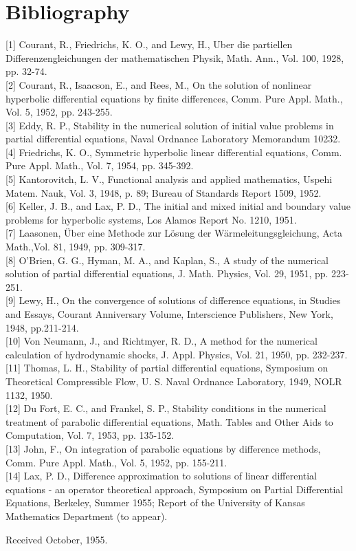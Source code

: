 \documentclass[10pt]{article}
\begin{document}
\section*{Bibliography}
[1] Courant, R., Friedrichs, K. O., and Lewy, H., Uber die partiellen Differenzengleichungen der mathematischen Physik, Math. Ann., Vol. 100, 1928, pp. 32-74.\\[0pt]
[2] Courant, R., Isaacson, E., and Rees, M., On the solution of nonlinear hyperbolic differential equations by finite differences, Comm. Pure Appl. Math., Vol. 5, 1952, pp. 243-255.\\[0pt]
[3] Eddy, R. P., Stability in the numerical solution of initial value problems in partial differential equations, Naval Ordnance Laboratory Memorandum 10232.\\[0pt]
[4] Friedrichs, K. O., Symmetric hyperbolic linear differential equations, Comm. Pure Appl. Math., Vol. 7, 1954, pp. 345-392.\\[0pt]
[5] Kantorovitch, L. V., Functional analysis and applied mathematics, Uspehi Matem. Nauk, Vol. 3, 1948, p. 89; Bureau of Standards Report 1509, 1952.\\[0pt]
[6] Keller, J. B., and Lax, P. D., The initial and mixed initial and boundary value problems for hyperbolic systems, Los Alamos Report No. 1210, 1951.\\[0pt]
[7] Laasonen, Über eine Methode zur Lösung der Wärmeleitungsgleichung, Acta Math.,Vol. 81, 1949, pp. 309-317.\\[0pt]
[8] O'Brien, G. G., Hyman, M. A., and Kaplan, S., A study of the numerical solution of partial differential equations, J. Math. Physics, Vol. 29, 1951, pp. 223-251.\\[0pt]
[9] Lewy, H., On the convergence of solutions of difference equations, in Studies and Essays, Courant Anniversary Volume, Interscience Publishers, New York, 1948, pp.211-214.\\[0pt]
[10] Von Neumann, J., and Richtmyer, R. D., A method for the numerical calculation of hydrodynamic shocks, J. Appl. Physics, Vol. 21, 1950, pp. 232-237.\\[0pt]
[11] Thomas, L. H., Stability of partial differential equations, Symposium on Theoretical Compressible Flow, U. S. Naval Ordnance Laboratory, 1949, NOLR 1132, 1950.\\[0pt]
[12] Du Fort, E. C., and Frankel, S. P., Stability conditions in the numerical treatment of parabolic differential equations, Math. Tables and Other Aids to Computation, Vol. 7, 1953, pp. 135-152.\\[0pt]
[13] John, F., On integration of parabolic equations by difference methods, Comm. Pure Appl. Math., Vol. 5, 1952, pp. 155-211.\\[0pt]
[14] Lax, P. D., Difference approximation to solutions of linear differential equations - an operator theoretical approach, Symposium on Partial Differential Equations, Berkeley, Summer 1955; Report of the University of Kansas Mathematics Department (to appear).

Received October, 1955.
\end{document}
